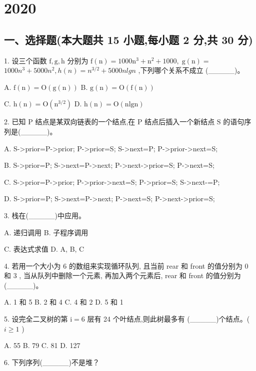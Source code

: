 \chapter{2020}
\section*{一、选择题(本大题共 15 小题,每小题 2 分,共 30 分)}

1. 设三个函数 \(\mathrm{f},\mathrm{g},\mathrm{h}\) 分别为 \(\mathrm{f}\left( \mathrm{n}\right)  = {1000}{\mathrm{n}}^{3} + {\mathrm{n}}^{2} + {1000},\mathrm{\;g}\left( \mathrm{n}\right)  =\)  \({1000}{n}^{3} + {5000}{n}^{2},h\left( n\right)  = {n}^{3/2} + {5000}{nl}{gn}\) ,下列哪个关系不成立 (\_\_\_\_\_)。

A. \(\mathrm{f}\left( \mathrm{n}\right)  = \mathrm{O}\left( {\mathrm{g}\left( \mathrm{n}\right) }\right)\) B. \(\mathrm{g}\left( \mathrm{n}\right)  = \mathrm{O}\left( {\mathrm{f}\left( \mathrm{n}\right) }\right)\)

C. \(\mathrm{h}\left( \mathrm{n}\right)  = \mathrm{O}\left( {\mathrm{n}}^{3/2}\right)\) D. \(\mathrm{h}\left( \mathrm{n}\right)  = \mathrm{O}\left( {\mathrm{{nl}}\mathrm{{gn}}}\right)\)

2. 已知 \(\mathrm{P}\) 结点是某双向链表的一个结点,在 \(\mathrm{P}\) 结点后插入一个新结点 \(\mathrm{S}\) 的语句序列是(\_\_\_\_\_)。

A. S->prior=P->prior;
P->prior=S;
S->next=P;
P->prior->next=S;

B.
S->prior=P;
S->next=P->next;
P->next->prior=S;
P->next=S;

C.
S->prior=P->prior;
P->prior->next=S;
P->prior=S;
S->next-=P;

D.
S->prior=P;
S->next=P->next;
P->next=S;
P->next->prior=S;

3. 栈在(\_\_\_\_\_)中应用。

A. 递归调用 B. 子程序调用

C. 表达式求值 D. A, B, C

4. 若用一个大小为 6 的数组来实现循环队列, 且当前 rear 和 front 的值分别为 0 和 3 , 当从队列中删除一个元素, 再加入两个元素后, rear 和 front 的值分别为(\_\_\_\_\_)。

A. 1 和 5 B. 2 和 4 C. 4 和 2 D. 5 和 1

5. 设完全二叉树的第 \(\mathrm{i} = 6\) 层有 24 个叶结点,则此树最多有 (\_\_\_\_\_)个结点。( \(i \geq  1\) )

A. 55 B. 79 C. 81 D. 127

6. 下列序列(\_\_\_\_\_)不是堆？

